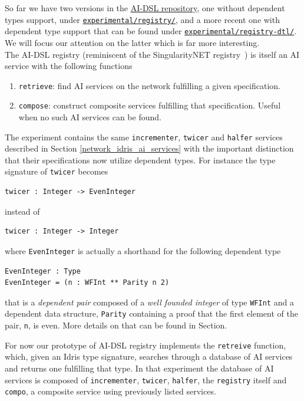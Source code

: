\documentclass[]{report}
\newcommand{\nil}[2][]{\todo[color=purple,author=nil, #1]{#2}}
\begin{document}
So far we have two versions in the
\href{https://github.com/singnet/ai-dsl/}{AI-DSL repository}, one
without dependent types support, under
\href{https://github.com/singnet/ai-dsl/blob/master/experimental/registry/}{\texttt{experimental/registry/}},
and a more recent one with dependent type support that can be found
under
\href{https://github.com/singnet/ai-dsl/blob/master/experimental/registry-dtl/}{\texttt{experimental/registry-dtl/}}.
We will focus our attention on the latter which is far more
interesting.\\

The AI-DSL registry (reminiscent of the SingularityNET
registry~\cite{SNETRegistry}) is itself an AI service with the following functions
\begin{enumerate}
\item \texttt{retrieve}: find AI services on the network fulfilling a
  given specification.
\item \texttt{compose}: construct composite services fulfilling that
  specification.  Useful when no such AI services can be found.
\end{enumerate}

The experiment contains the same \texttt{incrementer}, \texttt{twicer}
and \texttt{halfer} services described in Section
\ref{network_idris_ai_services} with the important distinction that
their specifications now utilize dependent types.  For instance the
type signature of \texttt{twicer} becomes
\begin{verbatim}
twicer : Integer -> EvenInteger
\end{verbatim}
instead of
\begin{verbatim}
twicer : Integer -> Integer
\end{verbatim}
where \texttt{EvenInteger} is actually a shorthand for the following
dependent type
\begin{verbatim}
EvenInteger : Type
EvenInteger = (n : WFInt ** Parity n 2)
\end{verbatim}
that is a \emph{dependent pair} composed of a \emph{well founded
integer} of type \texttt{WFInt} and a dependent data structure,
\texttt{Parity} containing a proof that the first element of the pair,
\texttt{n}, is even.  More details on that can be found in
Section\nil{Add ref to Sam's work}.

For now our prototype of AI-DSL registry implements the
\texttt{retreive} function, which, given an Idris type signature,
searches through a database of AI services and returns one fulfilling
that type.  In that experiment the database of AI services is composed
of \texttt{incrementer}, \texttt{twicer}, \texttt{halfer}, the
\texttt{registry} itself and \texttt{compo}, a composite service using
previously listed services.
\end{document}
